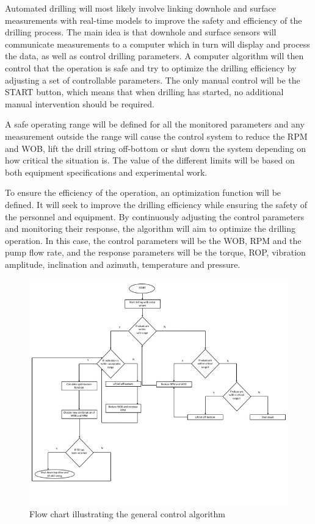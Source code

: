 Automated drilling will most likely involve linking downhole and surface measurements with real-time models to improve the safety and efficiency of the drilling process. The main idea is that downhole and surface sensors will communicate measurements to a computer which in turn will display and process the data, as well as control drilling parameters. A computer algorithm will then control that the operation is safe and try to optimize the drilling efficiency by adjusting a set of controllable parameters. The only manual control will be the START button, which means that when drilling has started, no additional manual intervention should be required.


A safe operating range will be defined for all the monitored parameters and any measurement outside the range will cause the control system to reduce the RPM and WOB, lift the drill string off-bottom or shut down the system depending on how critical the situation is. The value of the different limits will be based on both equipment specifications and experimental work.

To ensure the efficiency of the operation, an optimization function will be defined. It will seek to improve the drilling efficiency while ensuring the safety of the personnel and equipment. By continuously adjusting the control parameters and monitoring their response, the algorithm will aim to optimize the drilling operation. In this case, the control parameters will be the WOB, RPM and the pump flow rate, and the response parameters will be the torque, ROP, vibration amplitude, inclination and azimuth, temperature and pressure. 

\begin{figure} [H]
\centering
\includegraphics[width=1.0\textwidth]{figures/GeneralAlg.jpg}
\caption{Flow chart illustrating the general control algorithm}
\label{fig:algoflowchart}
\end{figure}



